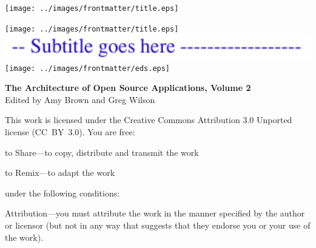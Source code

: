 \newpage

\thispagestyle{empty}
\hspace{-2cm}\texttt{[image: ../images/frontmatter/title.eps]} 

\newpage

\thispagestyle{empty}
\mbox{}    %

\newpage

\thispagestyle{empty}
\hspace{-2cm}\texttt{[image: ../images/frontmatter/title.eps]} 
\\
\vspace{0.5cm}
\hspace{2.8cm}\includegraphics{../images/frontmatter/subtitle.pdf}
\\[13.5cm]
\vspace{0.5cm}
\hspace{6.5cm}\texttt{[image: ../images/frontmatter/eds.eps]}

\newpage

\thispagestyle{empty}

\small
\noindent \textbf{The Architecture of Open Source Applications, Volume 2} \\
Edited by Amy Brown and Greg Wilson

\vspace{0.15cm}

\noindent
This work is licensed under the Creative Commons Attribution 3.0
Unported license (CC~BY~3.0).  You are free:

\begin{aosaitemize}
  \item to Share---to copy, distribute and transmit the work
  \item to Remix---to adapt the work
\end{aosaitemize}

\noindent
under the following conditions:

\begin{aosaitemize}
  \item Attribution---you must attribute the work in the manner
    specified by the author or licensor (but not in any way that
    suggests that they endorse you or your use of the work).
\end{aosaitemize}

